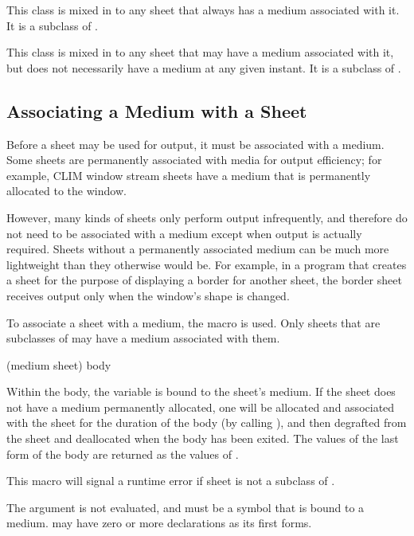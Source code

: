 This class is mixed in to any sheet that always has a medium associated with it.
It is a subclass of .


This class is mixed in to any sheet that may have a medium associated with it,
but does not necessarily have a medium at any given instant.  It is a subclass
of .


\subsection {Associating a Medium with a Sheet}

Before a sheet may be used for output, it must be associated with a medium.
Some sheets are permanently associated with media for output efficiency; for
example, CLIM window stream sheets have a medium that is permanently allocated
to the window.

However, many kinds of sheets only perform output infrequently, and therefore do
not need to be associated with a medium except when output is actually required.
Sheets without a permanently associated medium can be much more lightweight than
they otherwise would be.  For example, in a program that creates a sheet for the
purpose of displaying a border for another sheet, the border sheet receives
output only when the window's shape is changed.

To associate a sheet with a medium, the macro  is used.
Only sheets that are subclasses of  may have a
medium associated with them.


 {(medium sheet) \body body}

Within the body, the variable  is bound to the sheet's medium.  If
the sheet does not have a medium permanently allocated, one will be allocated
and associated with the sheet for the duration of the body (by calling
), and then degrafted from the sheet and deallocated when the
body has been exited.  The values of the last form of the body are returned as
the values of .

This macro will signal a runtime error if sheet is not a subclass of
.

The  argument is not evaluated, and must be a symbol that is bound
to a medium.   may have zero or more declarations as its first forms.

